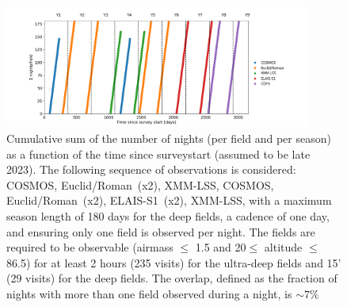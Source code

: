\documentclass[\docopts]{\docclass}
\newcommand{\cosmos}{{COSMOS}}
\newcommand{\elais}{{ELAIS-S1}}
\newcommand{\xmm}{{XMM-LSS}}
\newcommand{\adfs}{{Euclid/Roman}}
\begin{document}
\begin{figure}[htbp]
\begin{center}
  \includegraphics[width=0.9\textwidth]{timely_sequence_235visits.png}
  \caption{ Cumulative sum of the number of nights (per field and per season) as a function of the time since surveystart (assumed to be late 2023).  The following sequence of observations is considered: \cosmos, \adfs~(x2), \xmm, \cosmos, \adfs~(x2), \elais~(x2), \xmm ,  with  a  maximum  season  length  of  180  days for the deep fields,  a  cadence  of  one day, and ensuring only one field is observed per night.  The fields are required to be observable (airmass $\leq$ 1.5 and 20\textdegree $\leq$ altitude $\leq$ 86.5\textdegree) for at least 2 hours (235 visits) for the ultra-deep fields and 15' (29 visits) for the deep fields.  The overlap, defined as the fraction of nights with more than one field observed during a night, is $\sim7\%$}\label{fig:timelysequence}
\end{center}
\end{figure}
\end{document}
